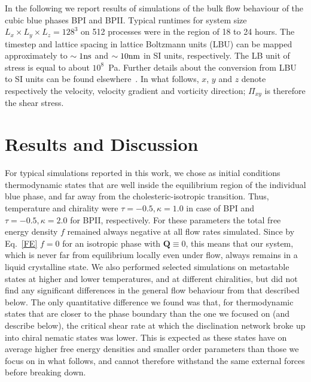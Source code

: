 \documentclass[8.5pt,twoside,twocolumn]{article}
\begin{document}
In the following we report results of simulations of the bulk flow behaviour of the cubic blue 
phases BPI and BPII.
Typical runtimes for system size $L_x\times L_y\times L_z=128^3$ on 512 processes were in the region of 18 to 24 hours.  
The timestep and lattice spacing in lattice Boltzmann units (LBU) can be mapped
approximately to $\sim 1 {\rm ns}$ and $\sim 10{\rm nm}$ in SI units, respectively. The LB unit of stress
is equal to about $10^8$~Pa. Further details about the conversion 
from LBU to SI units can be found elsewhere~\cite{Henrich:2011a,Henrich:2010b}.
In what follows, $x$, $y$ and $z$ denote respectively the velocity, velocity
gradient and vorticity direction; $\Pi_{xy}$ is therefore the shear stress.

\section{Results and Discussion}

For typical simulations reported in this work, 
we chose as initial conditions thermodynamic states that are 
well inside the equilibrium region of the individual blue phase, and far away 
from the cholesteric-isotropic transition. Thus, temperature and chirality were 
$\tau=-0.5, \kappa=1.0$ in case of BPI and $\tau=-0.5, \kappa=2.0$ for BPII, respectively.
For these parameters the total free energy density $f$ remained always negative at all flow rates
simulated. 
Since by Eq.~\ref{FE} $f=0$ for an isotropic phase with ${\mathbf Q}\equiv 0$, this means that our system, which is never far from equilibrium locally even under flow, always remains in a liquid crystalline state. 
We also performed selected simulations on metastable states at higher and lower temperatures, 
and at different chiralities, but did not find any significant differences in the 
general flow behaviour from that described below.
The only quantitative difference we found was that, for thermodynamic states that are closer to the phase boundary than the one we focused on (and describe below), the critical shear
rate at which the disclination 
network broke up into chiral nematic states was lower. This is expected as these states have on average higher free energy densities and smaller order parameters than those we focus on in what follows, and cannot therefore withstand the same external forces before breaking down.
\end{document}
